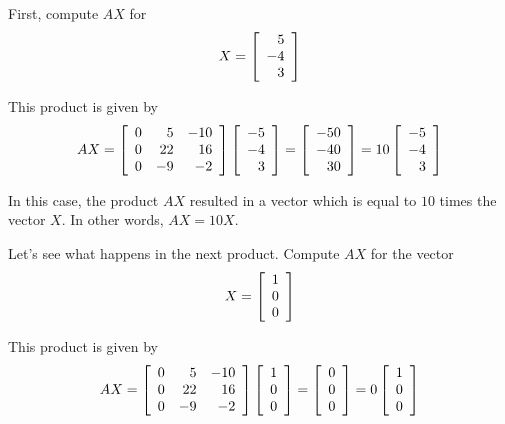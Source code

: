 \begin{solution}
First, compute $AX$ for 
\begin{equation*}
X =\left[
\begin{array}{r}
5 \\
-4 \\
3
\end{array}
\right]
\end{equation*}

This product is given by 
\begin{equation*}
AX = \left[
\begin{array}{rrr}
0 & 5 & -10 \\
0 & 22 & 16 \\
0 & -9 & -2
\end{array}
\right] \left[
\begin{array}{r}
-5 \\
-4 \\
3
\end{array}
\right] = \left[
\begin{array}{r}
-50 \\
-40 \\
30
\end{array}
\right] =10\left[
\begin{array}{r}
-5 \\
-4 \\
3
\end{array}
\right] 
\end{equation*}

In this case, the product $AX$ resulted in a vector which is equal to $10$ times the vector $X$. 
In other words, $AX=10X$.

Let's see what happens in the next product.
Compute $AX$ for the vector 
\begin{equation*}
X =  \left[
\begin{array}{r}
1 \\
0 \\
0
\end{array}
\right] 
\end{equation*}

This product is given by 
\begin{equation*}
AX = \left[
\begin{array}{rrr}
0 & 5 & -10 \\
0 & 22 & 16 \\
0 & -9 & -2
\end{array}
\right] \left[
\begin{array}{r}
1 \\
0 \\
0
\end{array}
\right] = \left[
\begin{array}{r}
0 \\
0 \\
0
\end{array}
\right] =0\left[
\begin{array}{r}
1 \\
0 \\
0
\end{array}
\right] 
\end{equation*}


\end{solution}
